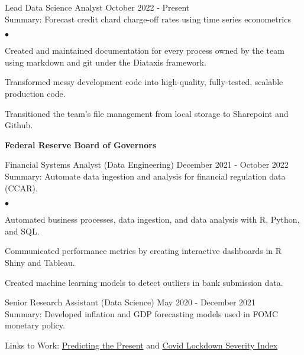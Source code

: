 \documentclass[margin, line]{res}
\newenvironment{list2}{
  \begin{list}{$\bullet$}{%
      \setlength{\itemsep}{0.04in}
      \setlength{\parsep}{0in} \setlength{\parskip}{0in}
      \setlength{\topsep}{0.05in} \setlength{\partopsep}{0in} 
      \setlength{\leftmargin}{\dimexpr 26pt-0.05in}}}
    {\end{list}}
\begin{document}
\begin{resume}
\vspace{-.65cm}
Lead Data Science Analyst \hfill October 2022 - Present\\
\hspace*{3mm} 
    Summary: Forecast credit chard charge-off rates using time series econometrics
\hspace*{3mm}
    \begin{list2}
        \item Created and maintained documentation for every process owned by the team using markdown and git under the Diataxis framework.
        \item Transformed messy development code into high-quality, fully-tested, scalable production code.
        \item Transitioned the team's file management from local storage to Sharepoint and Github.
    \end{list2}

{\bf Federal Reserve Board of Governors}\\

\vspace{-.65cm}

Financial Systems Analyst (Data Engineering) \hfill December 2021 - October 2022\\
\hspace*{3mm} 
    Summary: Automate data ingestion and analysis for financial regulation data (CCAR).
\hspace*{3mm}
    \begin{list2}
        \item Automated business processes, data ingestion, and data analysis with R, Python, and SQL.
        \item Communicated performance metrics by creating interactive dashboards in R Shiny and Tableau.
        \item Created machine learning models to detect outliers in bank submission data.
    \end{list2}


Senior Research Assistant (Data Science) \hfill May 2020 - December 2021 \\
\hspace*{3mm}
    Summary: Developed inflation and GDP forecasting models used in FOMC monetary policy.
\vspace{-3mm}

\hspace*{3mm}
    Links to Work:  \href{https://michaelboerman.medium.com/predicting-the-present-a56ff704af0b}{Predicting the Present} and   \href{https://github.com/michaelboerman/lockdown_severity_index#readme}{Covid Lockdown Severity Index}
    

\end{resume}
\end{document}
